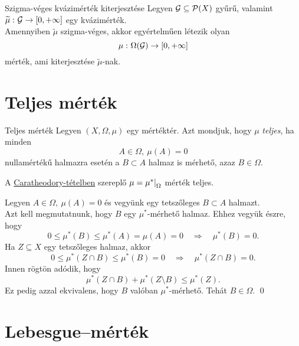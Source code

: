 \documentclass[
]{elteikthesis}[2024/04/26]
\begin{document}
	\begin{theorem}{Szigma-véges kvázimérték kiterjesztése}{}
		Legyen \( \mathcal{G} \subseteq \mathcal{P}( X ) \) gyűrű, 
		valamint \( \widetilde{\mu}  \,\colon  \mathcal{G}  \to  [0, +\infty] \) egy kvázimérték.\\[6pt]
		Amennyiben \( \widetilde{\mu} \) szigma-véges, akkor egyértelműen létezik olyan
		\[
			\mu  \,\colon  \Omega(\mathcal{G})  \to  [0, +\infty]
		\]
		mérték, ami kiterjesztése \( \widetilde{\mu} \)-nak.
	\end{theorem}
	
	\section{Teljes mérték}
	
	\begin{definition}{Teljes mérték}{}
		Legyen \( (X, \Omega, \mu) \) egy mértéktér.
		Azt mondjuk, hogy \( \mu \) \emph{teljes}, ha minden
		\[
			A \in \Omega, \ \mu(A) = 0
		\]
		nullamértékű halmazra esetén a \( B \subset A \) halmaz is mérhető, azaz \( B \in \Omega \).
	\end{definition}
	
	\begin{stat*}
		A \hyperref[th:caratheodory]{Caratheodory-tételben} szereplő 
		\( \mu = \restr{\mu^*}{\Omega} \) mérték teljes.
	\end{stat*}
	\begin{proof*}
		Legyen \( A \in \Omega, \ \mu(A) = 0 \) és 
		vegyünk egy tetszőleges \( B \subset A \) halmazt.\\[3pt]
		Azt kell megmutatnunk, hogy \( B \) egy \( \mu^* \)-mérhető halmaz.
		Ehhez vegyük észre, hogy
		\[
			0 \leq \mu^*(B) \leq \mu^*(A) = \mu(A) = 0
			\quad \Longrightarrow \quad
			\mu^*(B) = 0.
		\]
		Ha \( Z \subseteq X \) egy tetszőleges halmaz, akkor
		\[
			0 \leq 
			\mu^*(Z \cap B) \leq 
			\mu^*(B) =
			0
			\quad \Longrightarrow \quad
			\mu^*(Z \cap B) = 0.
		\]
		Innen rögtön adódik, hogy
		\[
			\mu^*(Z \cap B) + \mu^*(Z \setminus B) \leq
			\mu^*(Z).
		\]
		Ez pedig azzal ekvivalens, hogy \( B \) valóban \( \mu^* \)-mérhető.
		Tehát \( B \in \Omega \). \qed
	\end{proof*}
	
	\newpage
	\section{Lebesgue--mérték}
	
\end{document}

